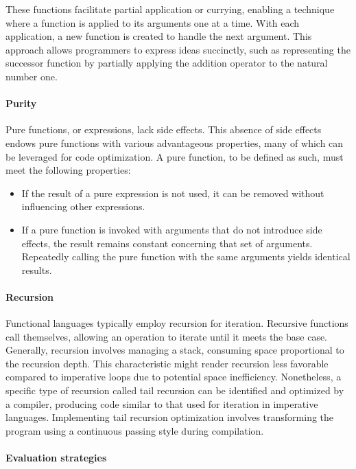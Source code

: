 These functions facilitate partial application or currying, enabling a technique where a function is applied to its arguments one at a time. With each application, a new function is created to handle the next argument. This approach allows programmers to express ideas succinctly, such as representing the successor function by partially applying the addition operator to the natural number one.

\paragraph{Purity}
Pure functions, or expressions, lack side effects. This absence of side effects endows pure functions with various advantageous properties, many of which can be leveraged for code optimization. A pure function, to be defined as such, must meet the following properties:

\begin{itemize}
    \item If the result of a pure expression is not used, it can be removed without influencing other expressions.
    \item If a pure function is invoked with arguments that do not introduce side effects, the result remains constant concerning that set of arguments. Repeatedly calling the pure function with the same arguments yields identical results.
\end{itemize}

\paragraph{Recursion}

Functional languages typically employ recursion for iteration. Recursive functions call themselves, allowing an operation to iterate until it meets the base case. Generally, recursion involves managing a stack, consuming space proportional to the recursion depth. This characteristic might render recursion less favorable compared to imperative loops due to potential space inefficiency. Nonetheless, a specific type of recursion called tail recursion can be identified and optimized by a compiler, producing code similar to that used for iteration in imperative languages. Implementing tail recursion optimization involves transforming the program using a continuous passing style during compilation.

\paragraph{Evaluation strategies}

